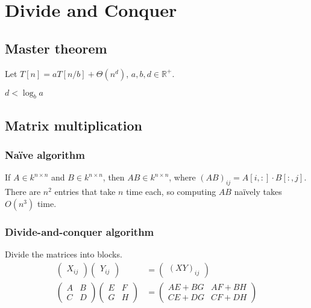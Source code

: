 \chapter{Divide and Conquer}
\section{Master theorem}
Let \(T[n] = aT[n/b] + \Theta(n^d)\), \(a, b, d \in \mathbb{R}^+\).
\begin{description}
	\item \(d < \log_ba\)
\end{description}

\section{Matrix multiplication}
\subsection{Na\"ive algorithm}
If \(A \in k^{n\times n}\) and \(B \in k^{n\times n}\), then \(AB \in k^{n\times n}\), where \(\left(AB\right)_{ij} = A[i,:] \cdot B[:,j]\). There are \(n^2\) entries that take \(n\) time each, so computing \(AB\) na\"ively takes \(O(n^3)\) time.

\subsection{Divide-and-conquer algorithm}
Divide the matrices into blocks.
\begin{align}
	\begin{pmatrix}
		X_{ij}
	\end{pmatrix}
	\begin{pmatrix}
		Y_{ij}
	\end{pmatrix}
	&=
	\begin{pmatrix}
		\left(XY\right)_{ij}
	\end{pmatrix}\\
	\begin{pmatrix}
		A & B \\
		C & D
	\end{pmatrix}
	\begin{pmatrix}
		E & F \\
		G & H
	\end{pmatrix}
	&=
	\begin{pmatrix}
		AE + BG & AF + BH \\
		CE + DG &  CF + DH
	\end{pmatrix}
\end{align}

